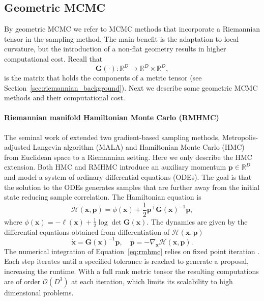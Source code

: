 \subsection{Geometric MCMC}
By geometric MCMC we refer to MCMC methods that incorporate a Riemannian tensor in the sampling method.
The main benefit is the adaptation to local curvature, but the introduction of a non-flat geometry results in higher computational cost. 
Recall that 
\begin{equation*}
 \mathbf{G}(\cdot):\mathbb{R}^D\to \mathbb{R}^D\times \mathbb{R}^D,   
\end{equation*}
is the matrix  that holds the components of a metric tensor (see Section~\ref{sec:riemannian_background}). 
Next we describe some geometric MCMC methods and their computational cost.

\paragraph{Riemannian manifold Hamiltonian Monte Carlo (RMHMC) }
The seminal work of \citet{Girolami2011} extended two gradient-based sampling methods,  Metropolis-adjusted Langevin algorithm (MALA) and Hamiltonian Monte Carlo (HMC) from Euclidean space to a Riemannian setting. Here we only describe the HMC extension. Both HMC and RMHMC introduce an auxiliary momentum $\boldsymbol{p}\in\mathbb{R}^D$ and model a system of ordinary differential equations (ODEs). The goal is that the solution to the ODEs generates samples that are further away from the initial state reducing sample correlation. The Hamiltonian equation is
\begin{equation*}
    \mathcal{H}(\boldsymbol{x},\boldsymbol{p})
    =
    \phi(\boldsymbol{x})
    +
    \frac{1}{2}\boldsymbol{p}^{\top}\mathbf{G}(\boldsymbol{x})^{-1}\boldsymbol{p},
\end{equation*}
where $\phi(\boldsymbol{x})=-\ell(\boldsymbol{x})+ \frac{1}{2}\log\det \mathbf{G}(\boldsymbol{x})$. The dynamics are given by the differential equations obtained from differentiation of $\mathcal{H}(\boldsymbol{x},\boldsymbol{p})$
\begin{equation}
    \dot{\boldsymbol{x}} = \mathbf{G}(\boldsymbol{x})^{-1}\boldsymbol{p},
    \quad
    \dot{\boldsymbol{p}} = - \nabla_{\boldsymbol{x}} \mathcal{H}(\boldsymbol{x},\boldsymbol{p}).
    \label{eq:rmhmc}
\end{equation}
The numerical integration of Equation~\ref{eq:rmhmc} relies on fixed point iteration \citep{Girolami2011}. Each step iterates until a specified tolerance is reached to generate a proposal, increasing the runtime. With a full rank metric tensor the resulting computations are of order $\mathcal{O}(D^3)$ at each iteration,  which limits its scalability to high dimensional problems.

